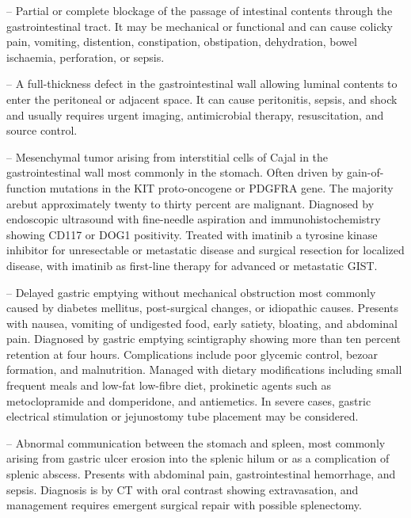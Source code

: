 -- Partial or complete blockage of the passage of intestinal contents through the gastrointestinal tract. It may be mechanical or functional and can cause colicky pain, vomiting, distention, constipation, obstipation, dehydration, bowel ischaemia, perforation, or sepsis.

-- A full-thickness defect in the gastrointestinal wall allowing luminal contents to enter the peritoneal or adjacent space. It can cause peritonitis, sepsis, and shock and usually requires urgent imaging, antimicrobial therapy, resuscitation, and source control.

-- Mesenchymal tumor arising from interstitial cells of Cajal in the gastrointestinal wall most commonly in the stomach. Often driven by gain-of-function mutations in the KIT proto-oncogene or PDGFRA gene. The majority arebut approximately twenty to thirty percent are malignant. Diagnosed by endoscopic ultrasound with fine-needle aspiration and immunohistochemistry showing CD117 or DOG1 positivity. Treated with imatinib a tyrosine kinase inhibitor for unresectable or metastatic disease and surgical resection for localized disease, with imatinib as first-line therapy for advanced or metastatic GIST.

-- Delayed gastric emptying without mechanical obstruction most commonly caused by diabetes mellitus, post-surgical changes, or idiopathic causes. Presents with nausea, vomiting of undigested food, early satiety, bloating, and abdominal pain. Diagnosed by gastric emptying scintigraphy showing more than ten percent retention at four hours. Complications include poor glycemic control, bezoar formation, and malnutrition. Managed with dietary modifications including small frequent meals and low-fat low-fibre diet, prokinetic agents such as metoclopramide and domperidone, and antiemetics. In severe cases, gastric electrical stimulation or jejunostomy tube placement may be considered.

-- Abnormal communication between the stomach and spleen, most commonly arising from gastric ulcer erosion into the splenic hilum or as a complication of splenic abscess. Presents with abdominal pain, gastrointestinal hemorrhage, and sepsis. Diagnosis is by CT with oral contrast showing extravasation, and management requires emergent surgical repair with possible splenectomy.

